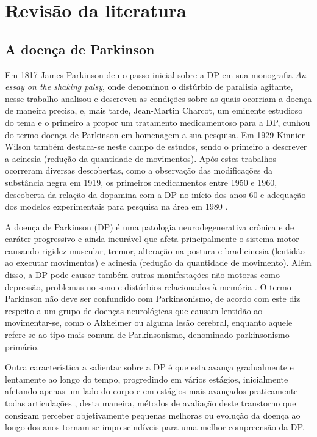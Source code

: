 \documentclass[
	12pt,				%
	openany,			%
	oneside,			%
	a4paper,			%
	english,			%
	french,				%
	spanish,			%
	brazil				%
	]{abntex2}
\begin{document}
\chapter{Revisão da literatura}

\section{A doença de Parkinson}
Em 1817 James Parkinson deu o passo inicial sobre a DP em sua monografia \textit{An essay on the shaking palsy}, onde denominou o distúrbio de paralisia agitante, nesse trabalho analisou e descreveu as condições sobre as quais ocorriam a doença de maneira precisa, e, mais tarde, Jean-Martin Charcot, um eminente estudioso do tema e o primeiro a propor um tratamento medicamentoso para a DP, cunhou do termo doença de Parkinson em homenagem a sua pesquisa. Em 1929 Kinnier Wilson também destaca-se neste campo de estudos, sendo o primeiro a descrever a acinesia (redução da quantidade de movimentos). Após estes trabalhos ocorreram diversas descobertas, como a observação das modificações da substância negra em 1919, os primeiros medicamentos entre 1950 e 1960, descoberta da relação da dopamina com a DP no início dos anos 60 e adequação dos modelos experimentais para pesquisa na área em 1980 \cite{limongi2001,ebook2016}.

A doença de Parkinson (DP) é uma patologia neurodegenerativa crônica e de caráter progressivo e ainda incurável que afeta principalmente o sistema motor causando rigidez muscular, tremor, alteração na postura e bradicinesia (lentidão ao executar movimentos) e acinesia (redução da quantidade de movimento). Além disso, a DP pode causar também outras manifestações não motoras como depressão, problemas no sono e distúrbios relacionados à memória \cite{limongi2001}. O termo Parkinson não deve ser confundido com Parkinsonismo, de acordo com  este diz respeito a um grupo de doenças neurológicas que causam lentidão ao movimentar-se, como o Alzheimer ou alguma lesão cerebral, enquanto aquele refere-se ao tipo mais comum de Parkinsonismo, denominado parkinsonismo primário.

Outra característica a salientar sobre a DP é que esta avança gradualmente e lentamente ao longo do tempo, progredindo em vários estágios, inicialmente afetando apenas um lado do corpo e em estágios mais avançados praticamente todas articulações \cite{rewar2015}, desta maneira, métodos de avaliação deste transtorno que consigam perceber objetivamente pequenas melhoras ou evolução da doença ao longo dos anos tornam-se imprescindíveis para uma melhor compreensão da DP.
\end{document}
